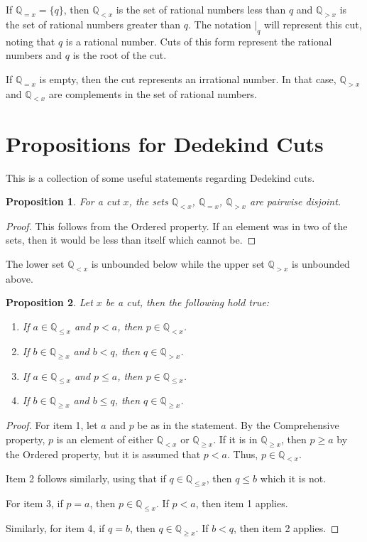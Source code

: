 \documentclass[12pt]{article}
\newtheorem{proposition}{Proposition}[section]
\newcommand{\qcut}[2][x]{\ensuremath{\mathbb{Q}_{#2 #1}}}
\newcommand{\qlt}[1][x]{\qcut[#1]{<}}
\newcommand{\qeq}[1][x]{\qcut[#1]{=}}
\newcommand{\qgt}[1][x]{\qcut[#1]{>}}
\newcommand{\qgeq}[1][x]{\qcut[#1]{\geq}}
\newcommand{\qleq}[1][x]{\qcut[#1]{\leq}}
\newcommand{\cut}[1][x]{{\vert}_{#1} }
\begin{document}
If $\qeq = \{q\}$, then $\qlt$ is the set of rational numbers less than $q$ and $\qgt$ is the set of rational numbers greater than $q$. The notation $\cut[q]$ will represent this cut, noting that $q$ is a rational number. Cuts of this form represent the rational numbers and $q$ is the root of the cut. 

If $\qeq$ is empty, then the cut represents an irrational number. In that case, $\qgt$ and $\qlt$ are complements in the set of rational numbers. 


\section{Propositions for Dedekind Cuts}

This is a collection of some useful statements regarding Dedekind cuts. 

\begin{proposition}
    For a cut $x$, the sets $\qlt$, $\qeq$, $\qgt$ are pairwise disjoint. 
\end{proposition}

\begin{proof}
    This follows from the Ordered property. If an element was in two of the sets, then it would be less than itself which cannot be. 
\end{proof}

The lower set $\qlt$ is unbounded below while the upper set $\qgt$ is unbounded above. 

\begin{proposition}\label{br:cut-unbounded}
    Let $x$ be a cut, then the following hold true:
    \begin{enumerate}
        \item If $a \in \qleq$ and $p < a$, then $p \in \qlt$. 
        \item If $b \in \qgeq$ and $b < q$, then $q \in \qgt$. 
        \item If $a \in \qleq$ and $p \leq a$, then $p \in \qleq$. 
        \item If $b \in \qgeq$ and $b \leq q$, then $q \in \qgeq$. 
    \end{enumerate}
\end{proposition}

\begin{proof}
    For item 1, let $a$ and $p$ be as in the statement. By the Comprehensive property, $p$ is an element of either $\qlt$ or $\qgeq$. If it is in $\qgeq$, then $p \geq a$ by the Ordered property, but it is assumed that $p < a$. Thus, $p \in \qlt$.

    Item 2 follows similarly, using that if $q \in \qleq$, then $q \leq b$ which it is not. 

    For item 3, if $p = a$, then $p \in \qleq$. If $p < a$, then item 1 applies. 

    Similarly, for item 4, if $q = b$, then $q \in \qgeq$. If $b < q$, then item 2 applies. 

\end{proof}
\end{document}
